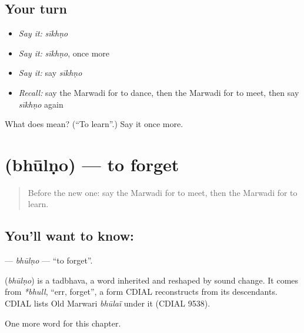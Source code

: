 \subsection*{Your turn}
\begin{itemize}
\raggedright
  \item \emph{Say it:} \emph{sīkhṇo}
  \item \emph{Say it:} \emph{sīkhṇo}, once more
  \item \emph{Say it:} say \emph{sīkhṇo}
  \item \emph{Recall:} say the Marwadi for to dance, then the Marwadi for to meet, then say \emph{sīkhṇo} again
\end{itemize}

\begin{tcolorbox}[breakable,colback=teal!4,colframe=teal!35!black,title={Before you move on}]
What does  mean? (\textquotedblleft{}To learn\textquotedblright{}.) Say it once more.
\end{tcolorbox}
\section[\texorpdfstring{\mw{भूलणो} (bhūlṇo)}{भूलणो (bhūlṇo)}]{ (bhūlṇo) — to forget}

\label{lesson:MW-C55-bhulno}



\begin{quote}
Before the new one: say the Marwadi for to meet, then the Marwadi for to learn.
\end{quote}

\subsection*{You'll want to know: }
\textbf{} — \emph{bhūlṇo} — \textquotedblleft{}to forget\textquotedblright{}.

\begin{cousinweb}
\textbf{} (\emph{bhūlṇo}) is a tadbhava, a word inherited and reshaped by sound change. It comes from \emph{*bhull}, \textquotedblleft{}err, forget\textquotedblright{}, a form CDIAL reconstructs from its descendants. CDIAL lists Old Marwari \emph{bhūlaï} under it (CDIAL 9538).
\end{cousinweb}

\begin{grammarlens}[title={What you've built}]
One more word for this chapter.
\end{grammarlens}

